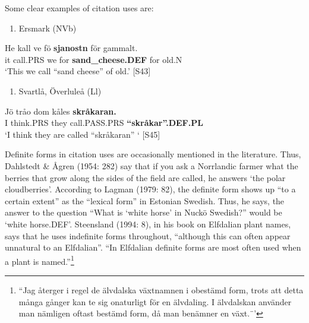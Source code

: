 Some clear examples of citation uses are:

\begin{enumerate} %
\item 
Ersmark (NVb) 

\end{enumerate} %
\ea\label{}
\gll He  kall  ve  fö  \textbf{sjanostn} för  gammalt.\\


it  call.PRS  we  for  \textbf{sand\_cheese.DEF} for  old.N\\ %


‘This we call “sand cheese” of old.’ [S43]
\z

\begin{enumerate} %
\item 
Svartlå, Överluleå (Ll)

\end{enumerate} %
\ea\label{}
\gll Jö  tråo  dom  kåles  \textbf{skråkaran.}\\


I  think.PRS  they  call.PASS.PRS  \textbf{“skråkar”.DEF.PL}\\ %


‘I think they are called “skråkaran” ‘ [S45]
\z

Definite forms in citation uses are occasionally mentioned in the literature. Thus, Dahlstedt \& Ågren (1954: 282) say that if you ask a Norrlandic farmer what the berries that grow along the sides of the field are called, he answers  ‘the polar cloudberries’. According to Lagman (1979: 82), the definite form shows up “to a certain extent” as the “lexical form” in Estonian Swedish. Thus, he says, the answer to the question “What is ‘white horse’ in Nuckö Swedish?” would be  ‘white horse.DEF’. Steensland (1994: 8), in his book on Elfdalian plant names, says that he uses indefinite forms throughout, “although this can often appear unnatural to an Elfdalian”.  “In Elfdalian definite forms are most often used when a plant is named.”\footnote{ “Jag återger i regel de älvdalska växtnamnen i obestämd form, trots att detta många gånger kan te sig onaturligt för en älvdaling. I älvdalskan använder man nämligen oftast bestämd form, då man benämner en växt.¨’}

